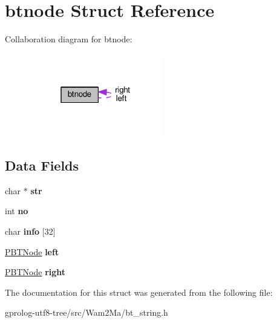 \hypertarget{structbtnode}{}\section{btnode Struct Reference}
\label{structbtnode}


Collaboration diagram for btnode\+:\nopagebreak
\begin{figure}[H]
\begin{center}
\leavevmode
\includegraphics[width=166pt]{structbtnode__coll__graph}
\end{center}
\end{figure}
\subsection*{Data Fields}
\begin{DoxyCompactItemize}
\item 
char $\ast$ {\bfseries str}\hypertarget{structbtnode_ad3235a44ef495ead7832dc7242184d3b}{}\label{structbtnode_ad3235a44ef495ead7832dc7242184d3b}

\item 
int {\bfseries no}\hypertarget{structbtnode_ae1befed4e49931603b1a62f760242f52}{}\label{structbtnode_ae1befed4e49931603b1a62f760242f52}

\item 
char {\bfseries info} \mbox{[}32\mbox{]}\hypertarget{structbtnode_a822bfc05cc3514c5d2799f66c65112e8}{}\label{structbtnode_a822bfc05cc3514c5d2799f66c65112e8}

\item 
\hyperlink{structbtnode}{P\+B\+T\+Node} {\bfseries left}\hypertarget{structbtnode_a595372884aee31dd6b91ba5400f98794}{}\label{structbtnode_a595372884aee31dd6b91ba5400f98794}

\item 
\hyperlink{structbtnode}{P\+B\+T\+Node} {\bfseries right}\hypertarget{structbtnode_a5a315554fa5e275f6f505e94135b1cf4}{}\label{structbtnode_a5a315554fa5e275f6f505e94135b1cf4}

\end{DoxyCompactItemize}


The documentation for this struct was generated from the following file\+:\begin{DoxyCompactItemize}
\item 
gprolog-\/utf8-\/tree/src/\+Wam2\+Ma/bt\+\_\+string.\+h\end{DoxyCompactItemize}
